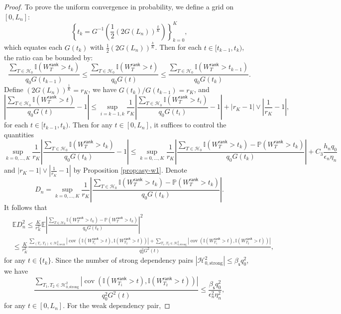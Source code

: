 \documentclass[10pt,a4paper]{amsart}
\newcommand{\E}{\mathbb{E}}
\newcommand{\PP}{\mathbb{P}}
\newcommand{\abs}[1]{\left\lvert#1\right\rvert}
\newcommand{\bbI}{\mathbb{I}}
\newcommand{\cH}{\mathcal{H}}
\begin{document}
\begin{proof}
To prove the uniform convergence in probability, we define a grid on $[0,L_n]$:
$$\left\{ t_k= G^{-1}\left( \frac{1}{2} (2G(L_n))^{\frac{k}{K}} \right) \right\}_{k=0}^{K},  $$
which equates each $G(t_k)$ with $\frac{1}{2} (2G(L_n))^{\frac{k}{K}}$. Then for each $t\in [t_{k-1},t_{k})$, the ratio can be bounded by:
\begin{equation*}
    \frac{ \sum_{T\in\cH_0}\bbI(W_T^{\mathsf{rank} }>t_{k} ) }{q_0 G(t_{k-1}) } \le \frac{ \sum_{T\in\cH_0}\bbI(W_T^{\mathsf{rank} }>t ) }{q_0 G(t) } \le  \frac{ \sum_{T\in\cH_0}\bbI(W_T^{\mathsf{rank} }>t_{k-1} ) }{q_0 G(t_{k}) }.
\end{equation*}
Define $(2G(L_n))^{\frac{1}{K}}=r_K$, we have $G(t_k)/G(t_{k-1})=r_K$, and 
\begin{equation*}
    \abs{\frac{ \sum_{T\in\cH_0}\bbI(W_T^{\mathsf{rank} }>t ) }{q_0 G(t) } -1}\le \sup_{i=k-1,k}\frac{1}{r_K} \abs{\frac{ \sum_{T\in\cH_0}\bbI(W_T^{\mathsf{rank} }>t_i ) }{q_0 G(t_{i}) }-1} +\abs{r_K-1}\vee\abs{\frac{1}{r_K}-1 },
\end{equation*}
for each $t\in [t_{k-1},t_{k})$. Then for any $t\in [0,L_n]$, it suffices to control the quantities 
\begin{equation*}
    \sup_{k=0,\dots, K}\frac{1}{r_K} \abs{\frac{ \sum_{T\in\cH_0}\bbI(W_T^{\mathsf{rank} }>t_k ) }{q_0 G(t_{k}) }-1}\le  \sup_{k=0,\dots, K}\frac{1}{r_K} \abs{\frac{ \sum_{T\in\cH_0}\bbI(W_T^{\mathsf{rank} }>t_k )-\PP(W_T^{\mathsf{rank} }>t_k ) }{q_0 G(t_{k}) }} + C_3 \frac{h_n q_0}{\epsilon_n \eta_n }
\end{equation*}
and $\abs{r_K-1}\vee\abs{\frac{1}{r_K}-1 }$ by Proposition \ref{prop:asy-w1}.  Denote 
$$D_n=\sup\limits_{k=0,\dots, K}\frac{1}{r_K} \abs{\frac{ \sum_{T\in\cH_0}\bbI(W_T^{\mathsf{rank} }>t_k )-\PP(W_T^{\mathsf{rank} }>t_k ) }{q_0 G(t_{k}) }}.$$ 
It follows that
\begin{equation}
    \begin{aligned}
              &\E D_n^2\le \frac{K}{r_K^2}\E \abs{\frac{ \sum_{T\in\cH_0}\bbI(W_T^{\mathsf{rank} }>t_{k} )-\PP(W_T^{\mathsf{rank} }>t_{k} ) }{q_0 G(t_{k}) }}^2\\
              &\le  \frac{K}{r_K^2} \frac{\sum\limits_{(T_1,T_2)\in\cH^2_{0,\text{weak}}} \abs{\operatorname{cov}(\bbI(W_{T_1}^{\mathsf{rank} }>t),\bbI(W_{T_2}^{\mathsf{rank} }>t)) } +\sum\limits_{T_1,T_2\in\cH^2_{0,\text{strong}} } \abs{\operatorname{cov}(\bbI(W_{T_1}^{\mathsf{rank} }>t),\bbI(W_{T_2}^{\mathsf{rank} }>t)) } }{q_0^2 G^2(t) },
    \end{aligned}
\end{equation}
for any $t\in \{t_k\}$. Since the number of strong dependency pairs $\abs{\cH^2_{0,\text{strong}}}\le \beta_{\mathsf{s}}q_0^2 $, we have
\begin{equation*}
    \frac{\sum\limits_{T_1,T_2\in\cH^2_{0,\text{strong}} } \abs{\operatorname{cov}(\bbI(W_{T_1}^{\mathsf{rank} }>t),\bbI(W_{T_2}^{\mathsf{rank} }>t)) }}{q_0^2 G^2(t) }\le \frac{\beta_{\mathsf{s}}q_0^2 }{ \epsilon_n^2\eta_n^2},
\end{equation*}
for any $t\in [0,L_n]$. For the weak dependency pair, 


\end{proof}
\end{document}
